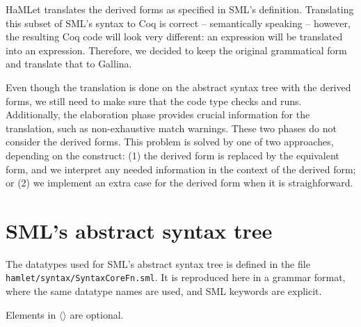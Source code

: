 \documentclass[a4paper,11pt]{article}
\begin{document}
HaMLet translates the derived forms as specified in SML's definition.
Translating this subset of SML's syntax to Coq is correct -- semantically
speaking -- however, the resulting Coq code will look very different: an
 expression will be translated into an 
expression. Therefore, we decided to keep the original grammatical form and
translate that to Gallina.

Even though the translation is done on the abstract syntax tree with the derived
forms, we still need to make sure that the code type checks and runs.
Additionally, the elaboration phase provides crucial information for the
translation, such as non-exhaustive match warnings. These two phases do not
consider the derived forms. This problem is solved by one of two approaches,
depending on the construct: (1) the derived form is replaced by the equivalent
form, and we interpret any needed information in the context of the derived
form; or (2) we implement an extra case for the derived form when it is
straighforward.


\section{SML's abstract syntax tree}

The datatypes used for SML's abstract syntax tree is defined in the file
\texttt{hamlet/syntax/SyntaxCoreFn.sml}. It is reproduced here in a grammar
format, where the same datatype names are used, and SML keywords are explicit.

Elements in $\langle\rangle$ are optional.
\end{document}
